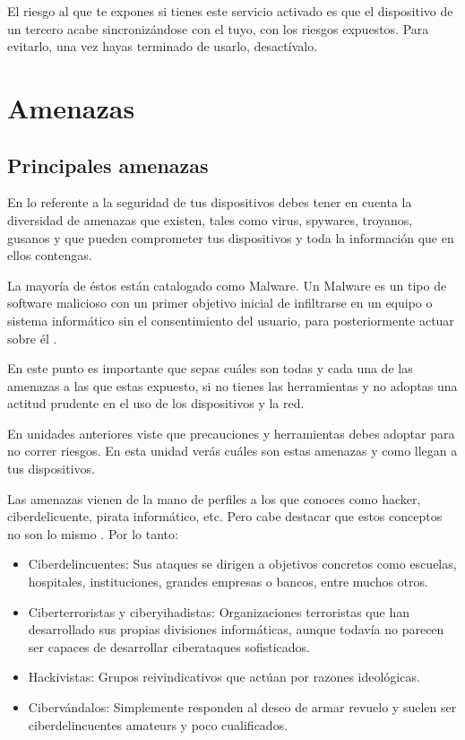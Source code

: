 \documentclass[
  spanish,
  a4paper,
  openany]{book}
\begin{document}
El riesgo al que te expones si tienes este servicio activado es que el dispositivo de un tercero acabe sincronizándose con el tuyo, con los riesgos expuestos. Para evitarlo, una vez hayas terminado de usarlo, desactívalo.

\hypertarget{amenazas}{%
\chapter{Amenazas}\label{amenazas}}

\hypertarget{principales-amenazas}{%
\section{Principales amenazas}\label{principales-amenazas}}

En lo referente a la seguridad de tus dispositivos debes tener en cuenta la diversidad de amenazas que existen, tales como virus, spywares, troyanos, gusanos y que pueden comprometer tus dispositivos y toda la información que en ellos contengas.

La mayoría de éstos están catalogado como Malware. Un Malware es un tipo de software malicioso con un primer objetivo inicial de infiltrarse en un equipo o sistema informático sin el consentimiento del usuario, para posteriormente actuar sobre él \citep{WIKI-malware}.

En este punto es importante que sepas cuáles son todas y cada una de las amenazas a las que estas expuesto, si no tienes las herramientas y no adoptas una actitud prudente en el uso de los dispositivos y la red.

En unidades anteriores viste que precauciones y herramientas debes adoptar para no correr riesgos. En esta unidad verás cuáles son estas amenazas y como llegan a tus dispositivos.

Las amenazas vienen de la mano de perfiles a los que conoces como hacker, ciberdelicuente, pirata informático, etc. Pero cabe destacar que estos conceptos no son lo mismo \citep{OSPI-ciberseguridad-espana}. Por lo tanto:

\begin{itemize}
\item
  Ciberdelincuentes: Sus ataques se dirigen a objetivos concretos como escuelas, hospitales, instituciones, grandes empresas o bancos, entre muchos otros.
\item
  Ciberterroristas y ciberyihadistas: Organizaciones terroristas que han desarrollado sus propias divisiones informáticas, aunque todavía no parecen ser capaces de desarrollar ciberataques sofisticados.
\item
  Hackivistas: Grupos reivindicativos que actúan por razones ideológicas.
\item
  Cibervándalos: Simplemente responden al deseo de armar revuelo y suelen ser ciberdelincuentes amateurs y poco cualificados.
\end{itemize}
\end{document}
